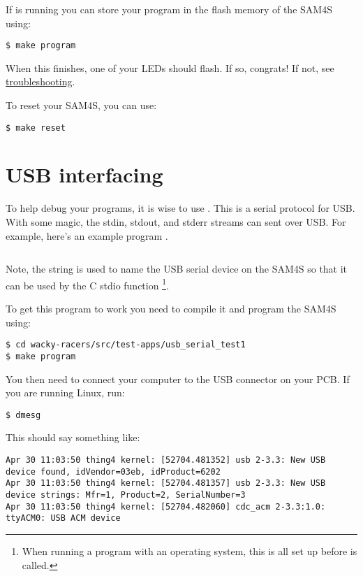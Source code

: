 If  is running you can store your program in the flash
memory of the SAM4S using:

\begin{verbatim}
$ make program
\end{verbatim}

When this finishes, one of your LEDs should flash. If so, congrats! If
not, see \protect\hyperref[troubleshooting]{troubleshooting}.

To reset your SAM4S, you can use:
%
\begin{verbatim}
$ make reset
\end{verbatim}

\section{USB interfacing}
\label{usb-interfacing}

To help debug your programs, it is wise to use .  This is a serial protocol for USB.  With some magic, the
stdin, stdout, and stderr streams can sent over USB.  For example,
here's an example program
.

\inputminted{C}{../../src/test-apps/usb_serial_test1/usb_serial_test1.c}

Note, the string  is used to name the USB serial
device on the SAM4S so that it can be used by the C stdio function
\footnote{When running a program with an operating
  system, this is all set up before  is called.}.

To get this program to work you need to compile it and program the
SAM4S using:
%
\begin{verbatim}
$ cd wacky-racers/src/test-apps/usb_serial_test1
$ make program
\end{verbatim}

You then need to connect your computer to the USB connector on your PCB.
If you are running Linux, run:
%
\begin{verbatim}
$ dmesg
\end{verbatim}

This should say something like:
%
\begin{verbatim}
Apr 30 11:03:50 thing4 kernel: [52704.481352] usb 2-3.3: New USB device found, idVendor=03eb, idProduct=6202
Apr 30 11:03:50 thing4 kernel: [52704.481357] usb 2-3.3: New USB device strings: Mfr=1, Product=2, SerialNumber=3
Apr 30 11:03:50 thing4 kernel: [52704.482060] cdc_acm 2-3.3:1.0: ttyACM0: USB ACM device
\end{verbatim}

